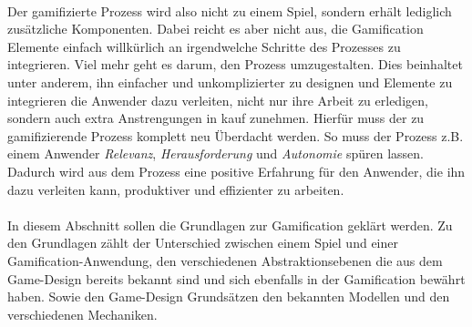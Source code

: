 \documentclass[a4paper,12pt,twoside]{scrartcl}
\begin{document}
\\
Der gamifizierte Prozess wird also nicht zu einem Spiel, sondern erhält lediglich zusätzliche Komponenten. Dabei reicht es aber nicht aus, die Gamification Elemente einfach willkürlich an irgendwelche Schritte des Prozesses zu integrieren. Viel mehr geht es darum, den Prozess umzugestalten. Dies beinhaltet unter anderem, ihn einfacher und unkomplizierter zu designen und Elemente zu integrieren die Anwender dazu verleiten, nicht nur ihre Arbeit zu erledigen, sondern auch extra Anstrengungen in kauf zunehmen. Hierfür muss der zu gamifizierende Prozess komplett neu Überdacht werden. So muss der Prozess z.B. einem Anwender \textit{Relevanz}, \textit{Herausforderung} und \textit{Autonomie} spüren lassen. Dadurch wird aus dem Prozess eine positive Erfahrung für den Anwender, die ihn dazu verleiten kann, produktiver und effizienter zu arbeiten.
\\\\
In diesem Abschnitt sollen die Grundlagen zur Gamification geklärt werden. Zu den Grundlagen zählt der Unterschied zwischen einem Spiel und einer Gamification-Anwendung, den verschiedenen Abstraktionsebenen die aus dem Game-Design bereits bekannt sind und sich ebenfalls in der Gamification bewährt haben. Sowie den Game-Design Grundsätzen den bekannten Modellen und den verschiedenen Mechaniken. 
\end{document}
